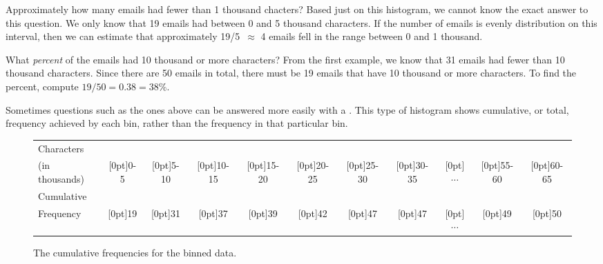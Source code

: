 \begin{examplewrap}
\begin{nexample}{Approximately how many emails had fewer than 1 thousand chacters?} Based just on this histogram, we cannot know the exact answer to this question. We only know that 19 emails had between 0 and 5 thousand characters. If the number of emails is evenly distribution on this interval, then we can estimate that approximately 19/5~$\approx$ 4 emails fell in the range between 0 and 1 thousand.
\end{nexample}
\end{examplewrap}

\begin{examplewrap}
\begin{nexample}{What \emph{percent} of the emails had 10 thousand or more characters?}
From the first example, we know that 31 emails had fewer than 10 thousand characters. Since there are 50 emails in total, there must be 19 emails that have 10 thousand or more characters. To find the percent, compute $19/50 = 0.38 = 38\%$.
\end{nexample}
\end{examplewrap}

\D{\newpage}

Sometimes questions such as the ones above can be answered more easily with a . This type of histogram shows cumulative, or total, frequency achieved by each bin, rather than the frequency in that particular bin.

\begin{figure}[ht]
\centering\small
\begin{tabular}{l ccc ccc ccc c}
  \hline
Characters & \\
(in thousands) & \raisebox{1.5ex}[0pt]{0-5} & \raisebox{1.5ex}[0pt]{5-10} & \raisebox{1.5ex}[0pt]{10-15} & \raisebox{1.5ex}[0pt]{15-20} & \raisebox{1.5ex}[0pt]{20-25} & \raisebox{1.5ex}[0pt]{25-30} &  \raisebox{1.5ex}[0pt]{30-35} &\raisebox{1.5ex}[0pt]{$\cdots$} & \raisebox{1.5ex}[0pt]{55-60} & \raisebox{1.5ex}[0pt]{60-65} \\
  \hline
Cumulative &\\
Frequency &  \raisebox{1.5ex}[0pt]{19} & \raisebox{1.5ex}[0pt]{31} & \raisebox{1.5ex}[0pt]{37} & \raisebox{1.5ex}[0pt]{39} & \raisebox{1.5ex}[0pt]{42} & \raisebox{1.5ex}[0pt]{47} & \raisebox{1.5ex}[0pt]{47} & \raisebox{1.5ex}[0pt]{$\cdots$} & \raisebox{1.5ex}[0pt]{49} & \raisebox{1.5ex}[0pt]{50} \\
  \hline
\end{tabular}
\caption{The cumulative frequencies for the binned  data.}
\label{binnedNumCharTableCumulative}
\end{figure}

